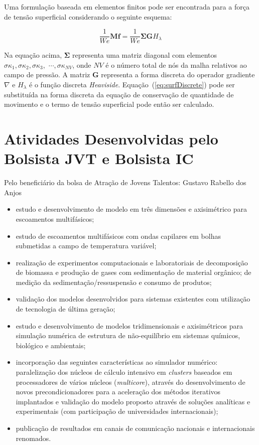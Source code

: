 \documentclass[a4paper,portuges,12pt]{article}
\newcommand{\fvet}{\mathbf{f}}
\begin{document}
Uma formulação baseada em elementos finitos pode ser encontrada para a
força de tensão superficial considerando o seguinte esquema: 

\begin{equation}
	\frac{1}{We}\mathbf{M} \fvet 
	= 
	\frac{1}{We} \mathbf{\Sigma} \mathbf{G} H_{\lambda}
	\label{eq:surfDiscrete}
\end{equation}\vspace{0.5cm}

Na equação acima, $\mathbf{\Sigma}$ representa uma matriz diagonal com
elementos $\sigma \kappa_1, \sigma \kappa_2, \sigma \kappa_3,$ $\cdots,
\sigma \kappa_{NV}$, onde $NV$ é o número total de nós da malha
relativos ao campo de pressão. A matriz $\mathbf{G}$ representa a forma
discreta do operador gradiente $\nabla$ e $H_{\lambda}$ é o função
discreta \textit{Heaviside}. Equação~(\ref{eq:surfDiscrete}) pode ser
substituída na forma discreta da equação de conservação de quantidade de
movimento e o termo de tensão superficial pode então ser calculado. 

\section{Atividades Desenvolvidas pelo Bolsista JVT e Bolsista IC}

Pelo beneficiário da bolsa de Atração de Jovens Talentos: Gustavo Rabello
dos Anjos
\begin{itemize}
	\item estudo e desenvolvimento de modelo em três dimensões e axisimétrico
	para escoamentos multifásicos;
	\item estudo de escoamentos multifásicos com ondas capilares em bolhas
	submetidas a campo de temperatura variável;
	\item realização de experimentos computacionais e laboratoriais de
	decomposição de biomassa e produção de gases com sedimentação de
	material orgânico; de medição da sedimentação/ressuspensão e consumo de
	produtos;
	\item validação dos modelos desenvolvidos para sistemas existentes com
	utilização de tecnologia de última geração;
	\item estudo e desenvolvimento de modelos tridimensionais e axisimétricos
	para simulação numérica de estrutura de não-equilíbrio em sistemas
	químicos, biológico e ambientais;
	\item incorporação das seguintes características ao simulador numérico:
	paralelização dos núcleos de cálculo intensivo em \textit{clusters}
	baseados em processadores de vários núcleos (\textit{multicore}),
	através do desenvolvimento de novos precondicionadores para a
	aceleração dos métodos iterativos implantados e validação do modelo
	proposto através de soluções analíticas e experimentais (com
	participação de universidades internacionais);
	\item publicação de resultados em canais de comunicação nacionais e
	internacionais renomados.
\end{itemize}
\end{document}
